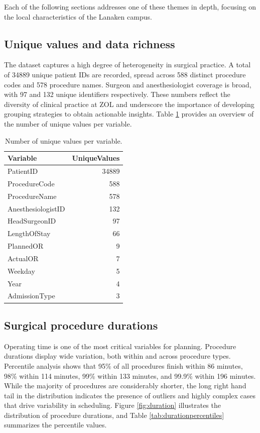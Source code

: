 \documentclass[
]{article}
\begin{document}
Each of the following sections addresses one of these themes in depth,
focusing on the local characteristics of the Lanaken campus.

\subsection{Unique values and data
richness}\label{unique-values-and-data-richness}

The dataset captures a high degree of heterogeneity in surgical
practice. A total of 34889 unique patient IDs are recorded, spread
across 588 distinct procedure codes and 578 procedure names. Surgeon and
anesthesiologist coverage is broad, with 97 and 132 unique identifiers
respectively. These numbers reflect the diversity of clinical practice
at ZOL and underscore the importance of developing grouping strategies
to obtain actionable insights. Table \ref{tab:uniquevalues} provides an
overview of the number of unique values per variable.

\begin{table}[H]

\caption{\label{tab:unique values}Number of unique values per variable. \label{tab:uniquevalues}}
\centering
\begin{tabular}[t]{lr}
\toprule
Variable & UniqueValues\\
\midrule
PatientID & 34889\\
ProcedureCode & 588\\
ProcedureName & 578\\
AnesthesiologistID & 132\\
HeadSurgeonID & 97\\
\addlinespace
LengthOfStay & 66\\
PlannedOR & 9\\
ActualOR & 7\\
Weekday & 5\\
Year & 4\\
\addlinespace
AdmissionType & 3\\
\bottomrule
\end{tabular}
\end{table}

\subsection{Surgical procedure
durations}\label{surgical-procedure-durations}

Operating time is one of the most critical variables for planning.
Procedure durations display wide variation, both within and across
procedure types. Percentile analysis shows that 95\% of all procedures
finish within 86 minutes, 98\% within 114 minutes, 99\% within 133
minutes, and 99.9\% within 196 minutes. While the majority of procedures
are considerably shorter, the long right hand tail in the distribution
indicates the presence of outliers and highly complex cases that drive
variability in scheduling. Figure \ref{fig:duration} illustrates the
distribution of procedure durations, and Table
\ref{tab:durationpercentiles} summarizes the percentile values.
\end{document}
